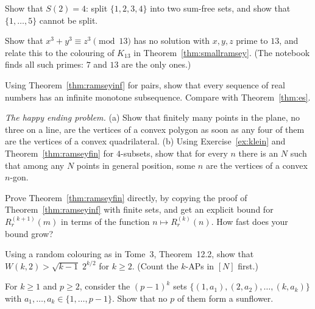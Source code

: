 \begin{exercise}[$\star$]\label{ex:schur2}
Show that $S(2)=4$: split $\{1,2,3,4\}$ into two sum-free sets, and show that $\{1,\dots,5\}$ cannot be split.
\end{exercise}

\begin{exercise}[$\star$]\label{ex:fermatp}
Show that $x^3+y^3\equiv z^3\pmod{13}$ has no solution with $x,y,z$ prime to $13$, and relate this to the colouring of $K_{13}$ in Theorem~\ref{thm:smallramsey}. (The notebook finds all such
primes: $7$ and $13$ are the only ones.)
\end{exercise}

\begin{exercise}[$\star$]\label{ex:monoseq}
Using Theorem~\ref{thm:ramseyinf} for pairs, show that every sequence of real numbers has an infinite monotone subsequence. Compare with Theorem~\ref{thm:es}.
\end{exercise}

\begin{exercise}[$\star\star$]\label{ex:happyending}
\emph{The happy ending problem.} (a) Show that finitely many points in the plane, no three on a line, are the vertices of a convex polygon as soon as any four of them are
the vertices of a convex quadrilateral. (b) Using Exercise~\ref{ex:klein} and Theorem~\ref{thm:ramseyfin} for $4$-subsets, show that for every $n$ there is an $N$ such that among any
$N$ points in general position, some $n$ are the vertices of a convex $n$-gon.
\end{exercise}

\begin{exercise}[$\star\star$]\label{ex:ramseydirect}
Prove Theorem~\ref{thm:ramseyfin} directly, by copying the proof of Theorem~\ref{thm:ramseyinf} with finite sets, and get an explicit bound for $R^{(k+1)}_r(m)$ in terms of the
function $n\mapsto R^{(k)}_r(n)$. How fast does your bound grow?
\end{exercise}

\begin{exercise}[$\star$]\label{ex:wlower}
Using a random colouring as in Tome~3, Theorem~12.2, show that $W(k,2)>\sqrt{k-1}\;2^{k/2}$ for $k\ge2$. (Count the $k$-APs in $[N]$ first.)
\end{exercise}

\begin{exercise}[$\star$]\label{ex:sunflowersharp}
For $k\ge1$ and $p\ge2$, consider the $(p-1)^k$ sets $\{(1,a_1),(2,a_2),\dots,(k,a_k)\}$ with $a_1,\dots,a_k\in\{1,\dots,p-1\}$. Show that no $p$ of them form a sunflower.
\end{exercise}

